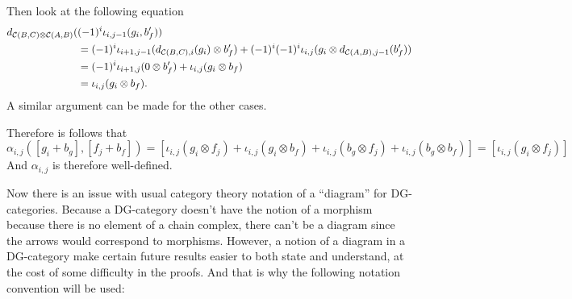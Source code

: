 \begin{remark}
\begin{enumerate}
{            Then look at the following equation
            \begin{align*}
                d_{{\mathcal{C}}(B, C) \otimes {\mathcal{C}}(A, B)}(&(-1)^i \iota_{i, j - 1}(g_i, b_f')) \\
                &= (-1)^i \iota_{i + 1, j - 1}(d_{{\mathcal{C}}(B, C), i}(g_i) \otimes b_f') + (-1)^i(-1)^i\iota_{i, j}(g_i \otimes d_{{\mathcal{C}}(A, B), j - 1}(b_f')) \\
                &= (-1)^i \iota_{i + 1, j}(0 \otimes b_f') + \iota_{i, j}(g_i \otimes b_f) \\
                &= \iota_{i, j}(g_i \otimes b_f).
            \end{align*}
            A similar argument can be made for the other cases.

            Therefore is follows that
            \[
                \alpha_{i, j}([g_i + b_g], [f_j + b_f]) = [\iota_{i, j}(g_i \otimes f_j) + \iota_{i, j}(g_i \otimes b_f) + \iota_{i, j}(b_g \otimes f_j) + \iota_ {i, j}(b_g \otimes b_f)] = [\iota_{i, j}(g_i \otimes f_j)]
            \]
            And \( \alpha_{i, j} \) is therefore well-defined.
        }
    \end{enumerate}
\end{remark}
\begin{remark}
    \label{rem:diagram_dg-category}
    Now there is an issue with usual category theory notation of a ``diagram'' for DG-categories. Because a DG-category doesn't have the notion of a morphism because there is no element of a chain complex, there can't be a diagram since the arrows would correspond to morphisms. However, a notion of a diagram in a DG-category make certain future results easier to both state and understand, at the cost of some difficulty in the proofs. And that is why the following notation convention will be used:
\end{remark}
